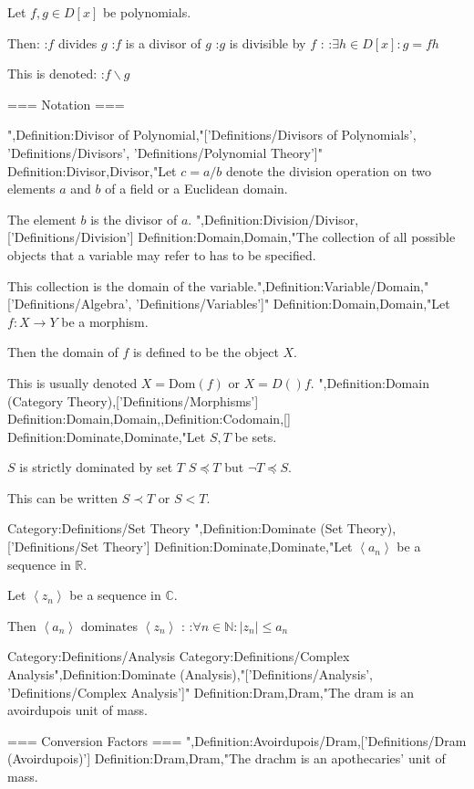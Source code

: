 Let $f, g \in D \left[ x \right]$ be polynomials.


Then:
:$f$ divides $g$
:$f$ is a divisor of $g$
:$g$ is divisible by $f$
:
:$\exists h \in D \left[ x \right] : g = f h$


This is denoted:
:$f \mathrel \backslash g$


=== Notation ===

",Definition:Divisor of Polynomial,"['Definitions/Divisors of Polynomials', 'Definitions/Divisors', 'Definitions/Polynomial Theory']"
Definition:Divisor,Divisor,"Let $c = a / b$ denote the division operation on two elements $a$ and $b$ of a field or a Euclidean domain.

The element $b$ is the divisor of $a$.
",Definition:Division/Divisor,['Definitions/Division']
Definition:Domain,Domain,"The collection of all possible objects that a variable may refer to has to be specified.

This collection is the domain of the variable.",Definition:Variable/Domain,"['Definitions/Algebra', 'Definitions/Variables']"
Definition:Domain,Domain,"Let $f: X \to Y$ be a morphism.

Then the domain of $f$ is defined to be the object $X$.

This is usually denoted $X = \mathrm {Dom} \left( f \right)$ or $X = D \left(   \right)f$.
",Definition:Domain (Category Theory),['Definitions/Morphisms']
Definition:Domain,Domain,,Definition:Codomain,[]
Definition:Dominate,Dominate,"Let $S, T$ be sets.


$S$ is strictly dominated by set $T$  $S \preccurlyeq T$ but $\neg T \preccurlyeq S$.

This can be written $S \prec T$ or $S < T$.


Category:Definitions/Set Theory
",Definition:Dominate (Set Theory),['Definitions/Set Theory']
Definition:Dominate,Dominate,"Let $\left\langle a_n \right\rangle$ be a sequence in $\mathbb R$.

Let $\left\langle z_n \right\rangle$ be a sequence in $\mathbb C$.


Then $\left\langle a_n \right\rangle$ dominates $\left\langle z_n \right\rangle$ :
:$\forall n \in \mathbb N: \left\lvert z_n \right\rvert \le a_n$

Category:Definitions/Analysis
Category:Definitions/Complex Analysis",Definition:Dominate (Analysis),"['Definitions/Analysis', 'Definitions/Complex Analysis']"
Definition:Dram,Dram,"The dram is an avoirdupois unit of mass.

=== Conversion Factors ===
",Definition:Avoirdupois/Dram,['Definitions/Dram (Avoirdupois)']
Definition:Dram,Dram,"The drachm is an apothecaries' unit of mass.

